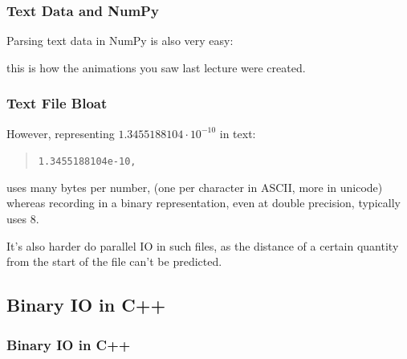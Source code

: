 \subsubsection{Text Data and NumPy}\label{text-data-and-numpy}

Parsing text data in NumPy is also very easy:

\begin{Shaded}
\begin{Highlighting}[]

                \NormalTok{)[:,:-}\NormalTok{]}
\end{Highlighting}
\end{Shaded}

\begin{Shaded}
\begin{Highlighting}[]

\end{Highlighting}
\end{Shaded}

this is how the animations you saw last lecture were created.

\subsubsection{Text File Bloat}\label{text-file-bloat}

However, representing $1.3455188104 \cdot 10^{-10}$ in text:

\begin{quote}
\texttt{1.3455188104e-10,}
\end{quote}

uses many bytes per number, (one per character in ASCII, more in
unicode) whereas recording in a binary representation, even at double
precision, typically uses 8.

It's also harder do parallel IO in such files, as the distance of a
certain quantity from the start of the file can't be predicted.

\subsection{Binary IO in C++}\label{binary-io-in-c}

\subsubsection{Binary IO in C++}\label{binary-io-in-c-1}

